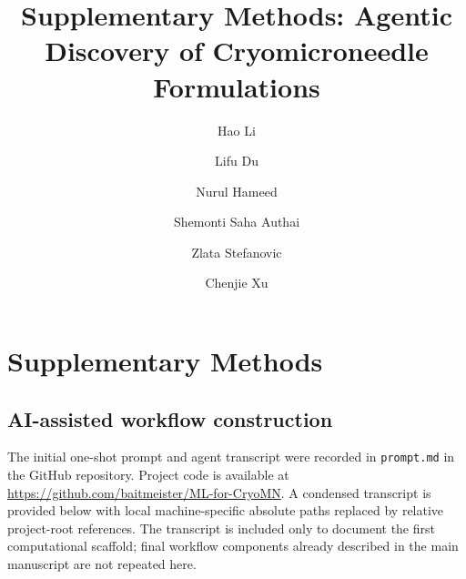 \documentclass[preprint,12pt]{elsarticle}
\begin{document}
\begin{frontmatter}

\title{Supplementary Methods: Agentic Discovery of Cryomicroneedle Formulations}

\author[cityu]{Hao Li}
\author[cityu]{Lifu Du}
\author[cityu]{Nurul Hameed}
\author[cityu]{Shemonti Saha Authai}
\author[cityu]{Zlata Stefanovic}
\author[cityu]{Chenjie Xu\texorpdfstring{}{}}


\end{frontmatter}

\section{Supplementary Methods}

\subsection{AI-assisted workflow construction}

The initial one-shot prompt and agent transcript were recorded in \texttt{prompt.md} in the GitHub repository. Project code is available at \url{https://github.com/baitmeister/ML-for-CryoMN}. A condensed transcript is provided below with local machine-specific absolute paths replaced by relative project-root references. The transcript is included only to document the first computational scaffold; final workflow components already described in the main manuscript are not repeated here.
\end{document}
